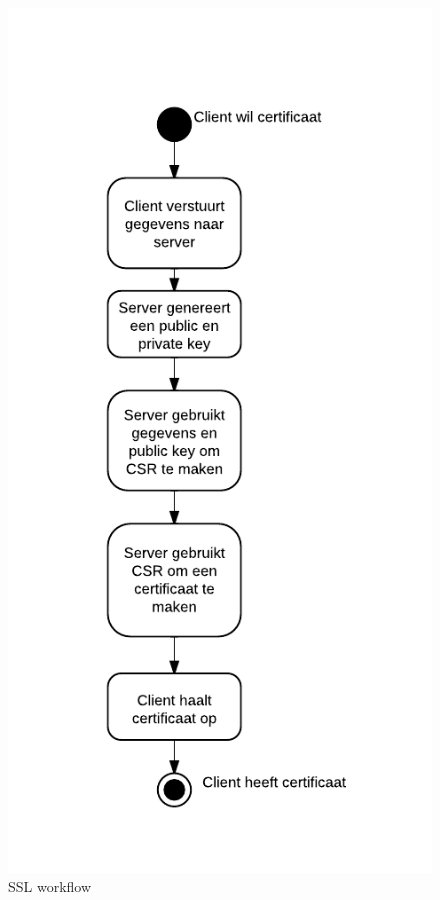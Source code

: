 \documentclass[]{article}
\begin{document}
\newpage
\begin{figure}
  \begin{center}
    \includegraphics[height=0.70\textheight]{ssl_ad_1.pdf}
  \end{center}
  \caption{SSL workflow}
  \label{ssl_ad_1}
\end{figure}
\end{document}
